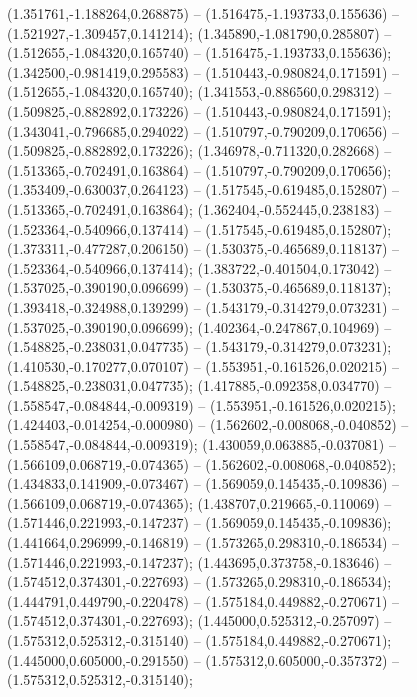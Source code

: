  (1.351761,-1.188264,0.268875) -- (1.516475,-1.193733,0.155636) -- (1.521927,-1.309457,0.141214);
 (1.345890,-1.081790,0.285807) -- (1.512655,-1.084320,0.165740) -- (1.516475,-1.193733,0.155636);
 (1.342500,-0.981419,0.295583) -- (1.510443,-0.980824,0.171591) -- (1.512655,-1.084320,0.165740);
 (1.341553,-0.886560,0.298312) -- (1.509825,-0.882892,0.173226) -- (1.510443,-0.980824,0.171591);
 (1.343041,-0.796685,0.294022) -- (1.510797,-0.790209,0.170656) -- (1.509825,-0.882892,0.173226);
 (1.346978,-0.711320,0.282668) -- (1.513365,-0.702491,0.163864) -- (1.510797,-0.790209,0.170656);
 (1.353409,-0.630037,0.264123) -- (1.517545,-0.619485,0.152807) -- (1.513365,-0.702491,0.163864);
 (1.362404,-0.552445,0.238183) -- (1.523364,-0.540966,0.137414) -- (1.517545,-0.619485,0.152807);
 (1.373311,-0.477287,0.206150) -- (1.530375,-0.465689,0.118137) -- (1.523364,-0.540966,0.137414);
 (1.383722,-0.401504,0.173042) -- (1.537025,-0.390190,0.096699) -- (1.530375,-0.465689,0.118137);
 (1.393418,-0.324988,0.139299) -- (1.543179,-0.314279,0.073231) -- (1.537025,-0.390190,0.096699);
 (1.402364,-0.247867,0.104969) -- (1.548825,-0.238031,0.047735) -- (1.543179,-0.314279,0.073231);
 (1.410530,-0.170277,0.070107) -- (1.553951,-0.161526,0.020215) -- (1.548825,-0.238031,0.047735);
 (1.417885,-0.092358,0.034770) -- (1.558547,-0.084844,-0.009319) -- (1.553951,-0.161526,0.020215);
 (1.424403,-0.014254,-0.000980) -- (1.562602,-0.008068,-0.040852) -- (1.558547,-0.084844,-0.009319);
 (1.430059,0.063885,-0.037081) -- (1.566109,0.068719,-0.074365) -- (1.562602,-0.008068,-0.040852);
 (1.434833,0.141909,-0.073467) -- (1.569059,0.145435,-0.109836) -- (1.566109,0.068719,-0.074365);
 (1.438707,0.219665,-0.110069) -- (1.571446,0.221993,-0.147237) -- (1.569059,0.145435,-0.109836);
 (1.441664,0.296999,-0.146819) -- (1.573265,0.298310,-0.186534) -- (1.571446,0.221993,-0.147237);
 (1.443695,0.373758,-0.183646) -- (1.574512,0.374301,-0.227693) -- (1.573265,0.298310,-0.186534);
 (1.444791,0.449790,-0.220478) -- (1.575184,0.449882,-0.270671) -- (1.574512,0.374301,-0.227693);
 (1.445000,0.525312,-0.257097) -- (1.575312,0.525312,-0.315140) -- (1.575184,0.449882,-0.270671);
 (1.445000,0.605000,-0.291550) -- (1.575312,0.605000,-0.357372) -- (1.575312,0.525312,-0.315140);
